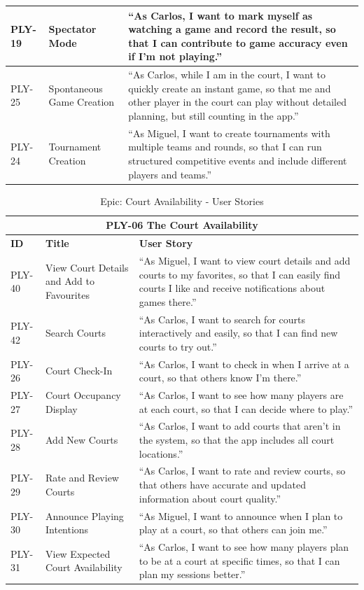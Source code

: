 \begin{table}[h]
\begin{tabular}{p{2cm}p{4cm}p{8cm}}
		\midrule
		PLY-19 & Spectator Mode & ``As Carlos, I want to mark myself as watching a game and record the result, so that I can contribute to game accuracy even if I'm not playing.'' \\
		\midrule
		PLY-25 & Spontaneous Game Creation & ``As Carlos, while I am in the court, I want to quickly create an instant game, so that me and other player in the court can play without detailed planning, but still counting in the app.'' \\
		\midrule
		PLY-24 & Tournament Creation & ``As Miguel, I want to create tournaments with multiple teams and rounds, so that I can run structured competitive events and include different players and teams.'' \\
		\bottomrule
	\end{tabular}
\end{table}

\begin{table}[h]
	\centering
	\caption{Epic: Court Availability - User Stories}
	\label{tab:epic-court-availability}
	\begin{tabular}{p{2cm}p{4cm}p{8cm}}
		\toprule
		\multicolumn{3}{c}{\textbf{PLY-06 The Court Availability}}\\
		\midrule
		\textbf{ID} & \textbf{Title} & \textbf{User Story} \\
		\midrule
		PLY-40 & View Court Details and Add to Favourites & ``As Miguel, I want to view court details and add courts to my favorites, so that I can easily find courts I like and receive notifications about games there.'' \\
		\midrule
		PLY-42 & Search Courts & ``As Carlos, I want to search for courts interactively and easily, so that I can find new courts to try out.'' \\
		\midrule
		PLY-26 & Court Check-In & ``As Carlos, I want to check in when I arrive at a court, so that others know I'm there.'' \\
		\midrule
		PLY-27 & Court Occupancy Display & ``As Carlos, I want to see how many players are at each court, so that I can decide where to play.'' \\
		\midrule
		PLY-28 & Add New Courts & ``As Carlos, I want to add courts that aren't in the system, so that the app includes all court locations.'' \\
		\midrule
		PLY-29 & Rate and Review Courts & ``As Carlos, I want to rate and review courts, so that others have accurate and updated information about court quality.'' \\
		\midrule
		PLY-30 & Announce Playing Intentions & ``As Miguel, I want to announce when I plan to play at a court, so that others can join me.'' \\
		\midrule
		PLY-31 & View Expected Court Availability & ``As Carlos, I want to see how many players plan to be at a court at specific times, so that I can plan my sessions better.'' \\
		\bottomrule
	\end{tabular}
\end{table}

